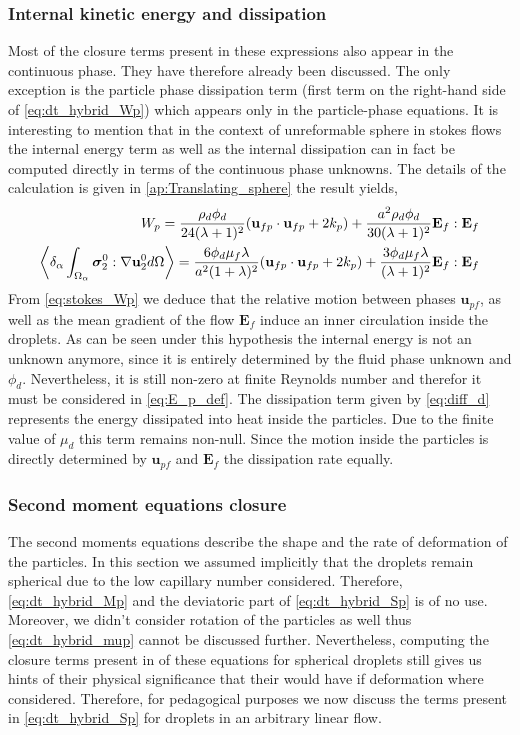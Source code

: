 \subsubsection{Internal kinetic energy and dissipation}
Most of the closure terms present in these expressions also appear in the continuous phase. 
They have therefore already been discussed. 
The only exception is the particle phase dissipation term (first term on the right-hand side of \ref{eq:dt_hybrid_Wp}) which appears only in the particle-phase equations. 
It is interesting to mention that in the context of unreformable sphere in stokes flows the internal energy term as well as the internal dissipation can in fact be computed directly in terms of the continuous phase unknowns. 
The details of the calculation is given in \ref{ap:Translating_sphere} the result yields, 
\begin{align}
    \label{eq:stokes_Wp}
    W_p =  \frac{\rho_d \phi_d}{24 (\lambda +1)^2}
    (\textbf{u}_{fp} \cdot \textbf{u}_{fp} + 2 k_p)
    + \frac{a^2 \rho_d \phi_d}{30(\lambda+1)^2}
    \textbf{E}_f:\textbf{E}_f    \\
    \left<\delta_\alpha \int_{\Omega_\alpha} \bm{\sigma}_2^0:\mathbf{\nabla} \textbf{u}_2^0 d\Omega\right>
    = 
    \frac{6 \phi_d \mu_f \lambda}{a^2(1+\lambda)^2}
    (\textbf{u}_{fp}\cdot \textbf{u}_{fp} + 2k_p)
    + \frac{3 \phi_d \mu_f \lambda}{(\lambda+1)^2}\textbf{E}_f:\textbf{E}_f
    \label{eq:diff_d}
\end{align}
From \ref{eq:stokes_Wp} we deduce that the relative motion between phases $\textbf{u}_{pf}$, as well as the mean gradient of the flow $\textbf{E}_f$ induce an inner circulation inside the droplets. 
As can be seen under this hypothesis the internal energy is not an unknown anymore, since it is entirely determined by the fluid phase unknown and $\phi_d$. 
Nevertheless, it is still non-zero at finite Reynolds number and therefor it must be considered in \ref{eq:E_p_def}. 
The dissipation term given by \ref{eq:diff_d} represents the energy dissipated into heat inside the particles. 
Due to the finite value of $\mu_d$ this term remains non-null. 
Since the motion inside the particles is directly determined by $\textbf{u}_{pf}$ and $\textbf{E}_f$ the dissipation rate equally. 


\subsubsection{Second moment equations closure}

The second moments equations describe the shape and the rate of deformation of the particles.
In this section we assumed implicitly that the droplets remain spherical due to the low capillary number considered. 
Therefore, \ref{eq:dt_hybrid_Mp} and the deviatoric part of \ref{eq:dt_hybrid_Sp} is of no use. 
Moreover, we didn't consider rotation of the particles as well thus \ref{eq:dt_hybrid_mup} cannot be discussed further. 
Nevertheless, computing the closure terms present in of these equations for spherical droplets still gives us hints of their physical significance that their would have if deformation where considered.
Therefore, for pedagogical purposes we now discuss the terms present in \ref{eq:dt_hybrid_Sp} for droplets in an arbitrary linear flow. 



